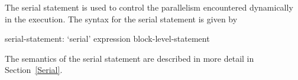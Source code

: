 The serial statement is used to control the parallelism encountered
dynamically in the execution.  The syntax for the serial statement is
given by
\begin{syntax}
serial-statement:
  `serial' expression block-level-statement
\end{syntax}

The semantics of the serial statement are described in more detail in
Section~\ref{Serial}.
